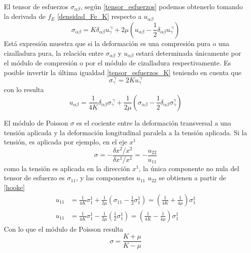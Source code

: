 El tensor de esfuerzos $\sigma_{\alpha\beta}$, según \eqref{tensor_esfuerzos}
podemos obtenerlo tomando la derivada de $f_E$ \eqref{densidad_Fe_K} respecto
a $u_{\alpha\beta}$
\begin{equation}\label{tensor_esfuerzos_K}
\sigma_{\alpha\beta}=K\delta_{\alpha\beta}u_{\gamma}^{\ \gamma}+2\mu\left(u_{\alpha\beta}-\frac{1}{2}\delta_{\alpha\beta}u_{\gamma}^{\ \gamma}\right)
\end{equation}
Está expresión muestra que si la deformación es una compresión pura o una
cizalladura pura, la relación entre $\sigma_{\alpha\beta}$ y $u_{\alpha\beta}$
estará determinada únicamente por el módulo de compresión o por el módulo de
cizalladura respectivamente. Es posible invertir la última igualdad
\eqref{tensor_esfuerzos_K} teniendo en cuenta que
\begin{equation}
\sigma_{\gamma}^{\ \gamma}=2 K u_{\gamma}^{\ \gamma}
\end{equation}
con lo resulta
\begin{equation}\label{hooke}
u_{\alpha\beta}=\frac{1}{4K}\delta_{\alpha\beta}\sigma_{\gamma}^{\ \gamma}+\frac{1}{2\mu}\left(\sigma_{\alpha\beta}-\frac{1}{2}\delta_{\alpha\beta}\sigma_{\gamma}^{\gamma}\right)
\end{equation}


El módulo de Poisson $\sigma$ es el cociente entre la deformación transversal
a una tensión aplicada y la deformación longitudinal paralela a la tensión
aplicada. Si la tensión, es aplicada por ejemplo, en el eje $x^1$
\begin{equation}
\sigma=-\frac{\delta x^2 / x^2}{\delta x^1 / x^1}=-\frac{u_{22}}{u_{11}}
\end{equation}
como la tensión es aplicada en la dirección $x^1$, la única componente no nula
del tensor de esfuerzo es $\sigma_{11}$, y las componentes $u_{11}$ $u_{22}$
se obtienen a partir de \eqref{hooke}
\begin{align}
u_{11}&=\frac{1}{4K}\sigma_1^1+\frac{1}{2\mu}\left(\sigma_{11}-\frac{1}{2}\sigma_1^1\right)=\left(\frac{1}{4K}+\frac{1}{4\mu}\right)\sigma_1^1\\
u_{11}&=\frac{1}{4K}\sigma_1^1-\frac{1}{2\mu}\left(\frac{1}{2}\sigma_1^1\right)=\left(\frac{1}{4K}-\frac{1}{4\mu}\right)\sigma_1^1
\end{align}
Con lo que el módulo de Poisson resulta
\begin{equation}
\sigma=\frac{K+\mu}{K-\mu}
\end{equation}




